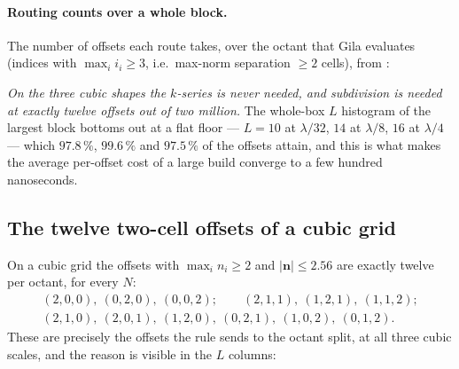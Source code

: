 \paragraph{Routing counts over a whole block.} The number of offsets each route takes, over
the  octant that Gila evaluates (indices with $\max_i i_i \ge 3$, i.e.\
max-norm separation $\ge 2$ cells), from :

\begin{center}\footnotesize

\end{center}

\noindent
\emph{On the three cubic shapes the $k$-series is never needed, and subdivision is needed at
exactly twelve offsets out of two million.} The whole-box $L$ histogram of the largest block
bottoms out at a flat floor --- $L = 10$ at $\lambda/32$, $14$ at $\lambda/8$, $16$ at
$\lambda/4$ --- which $97.8\,\%$, $99.6\,\%$ and $97.5\,\%$ of the offsets attain, and this
is what makes the average per-offset cost of a large build converge to a few hundred
nanoseconds.

\subsection{The twelve two-cell offsets of a cubic grid}
\label{sec:join:twelve}

On a cubic grid the offsets with $\max_i n_i \ge 2$ and $|\mathbf{n}| \le 2.56$ are
exactly twelve per octant, for every $N$:
\begin{gather*}
(2,0,0),\ (0,2,0),\ (0,0,2);\qquad
(2,1,1),\ (1,2,1),\ (1,1,2);\\
(2,1,0),\ (2,0,1),\ (1,2,0),\ (0,2,1),\ (1,0,2),\ (0,1,2).
\end{gather*}
These are precisely the offsets the rule sends to the octant split, at all three cubic
scales, and the reason is visible in the $L$ columns:

